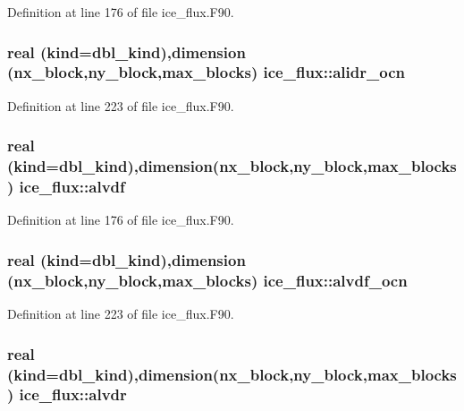 Definition at line 176 of file ice\_\-flux.F90.\hypertarget{namespaceice__flux_a28770e51f25a00f4a215c889264041b8}{
\subsubsection[{alidr\_\-ocn}]{\setlength{\rightskip}{0pt plus 5cm}real (kind=dbl\_\-kind),dimension (nx\_\-block,ny\_\-block,max\_\-blocks) {\bf ice\_\-flux::alidr\_\-ocn}}}
\label{namespaceice__flux_a28770e51f25a00f4a215c889264041b8}


Definition at line 223 of file ice\_\-flux.F90.\hypertarget{namespaceice__flux_a2cb96fbc3ffddc795321900557ce8ff6}{
\subsubsection[{alvdf}]{\setlength{\rightskip}{0pt plus 5cm}real (kind=dbl\_\-kind),dimension(nx\_\-block,ny\_\-block,max\_\-blocks) {\bf ice\_\-flux::alvdf}}}
\label{namespaceice__flux_a2cb96fbc3ffddc795321900557ce8ff6}


Definition at line 176 of file ice\_\-flux.F90.\hypertarget{namespaceice__flux_a3060ba0c930f8b0676cfc2a6af612769}{
\subsubsection[{alvdf\_\-ocn}]{\setlength{\rightskip}{0pt plus 5cm}real (kind=dbl\_\-kind),dimension (nx\_\-block,ny\_\-block,max\_\-blocks) {\bf ice\_\-flux::alvdf\_\-ocn}}}
\label{namespaceice__flux_a3060ba0c930f8b0676cfc2a6af612769}


Definition at line 223 of file ice\_\-flux.F90.\hypertarget{namespaceice__flux_a87ebd7f059dc2e9052efba54a0d361ec}{
\subsubsection[{alvdr}]{\setlength{\rightskip}{0pt plus 5cm}real (kind=dbl\_\-kind),dimension(nx\_\-block,ny\_\-block,max\_\-blocks) {\bf ice\_\-flux::alvdr}}}
\label{namespaceice__flux_a87ebd7f059dc2e9052efba54a0d361ec}


